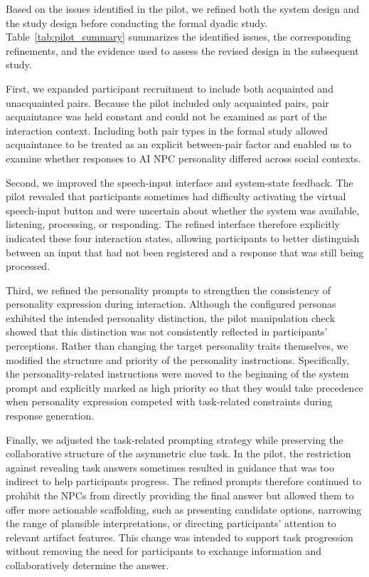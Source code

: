 \documentclass[a4paper,fleqn]{cas-sc}
\begin{document}
Based on the issues identified in the pilot, we refined both the system design and the study design before conducting the formal dyadic study. Table~\ref{tab:pilot_summary} summarizes the identified issues, the corresponding refinements, and the evidence used to assess the revised design in the subsequent study.

First, we expanded participant recruitment to include both acquainted and unacquainted pairs. Because the pilot included only acquainted pairs, pair acquaintance was held constant and could not be examined as part of the interaction context. Including both pair types in the formal study allowed acquaintance to be treated as an explicit between-pair factor and enabled us to examine whether responses to AI NPC personality differed across social contexts.

Second, we improved the speech-input interface and system-state feedback. The pilot revealed that participants sometimes had difficulty activating the virtual speech-input button and were uncertain about whether the system was available, listening, processing, or responding. The refined interface therefore explicitly indicated these four interaction states, allowing participants to better distinguish between an input that had not been registered and a response that was still being processed.

Third, we refined the personality prompts to strengthen the consistency of personality expression during interaction. Although the configured personas exhibited the intended personality distinction, the pilot manipulation check showed that this distinction was not consistently reflected in participants' perceptions. Rather than changing the target personality traits themselves, we modified the structure and priority of the personality instructions. Specifically, the personality-related instructions were moved to the beginning of the system prompt and explicitly marked as high priority so that they would take precedence when personality expression competed with task-related constraints during response generation.

Finally, we adjusted the task-related prompting strategy while preserving the collaborative structure of the asymmetric clue task. In the pilot, the restriction against revealing task answers sometimes resulted in guidance that was too indirect to help participants progress. The refined prompts therefore continued to prohibit the NPCs from directly providing the final answer but allowed them to offer more actionable scaffolding, such as presenting candidate options, narrowing the range of plausible interpretations, or directing participants' attention to relevant artifact features. This change was intended to support task progression without removing the need for participants to exchange information and collaboratively determine the answer.
\end{document}

